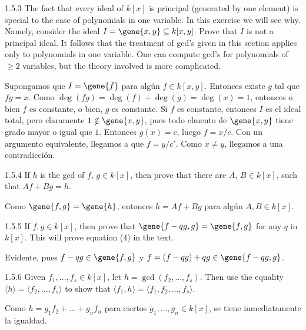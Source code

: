 \documentclass[twoside]{article}
\begin{document}
\begin{ejercicio}{1.5.3}
The fact that every ideal of $k[x]$ is principal (generated by one element) is special to the case of polynomials in one variable.
In this exercise we will see why.
Namely, consider the ideal $I=\gene{x,y} \subseteq k[x,y]$.
Prove that $I$ is not a principal ideal.
It follows that the treatment of gcd’s given in this section applies only to polynomials in one variable.
One can compute gcd’s for polynomials of $≥ 2$ variables, but the theory involved is more complicated.
\end{ejercicio}
\begin{solucion}
Supongamos que $I = \gene{f}$ para algún $f \in k[x,y]$.
Entonces existe $g$ tal que $fg = x$.
Como $\deg(fg) = \deg(f) + \deg(g) = \deg(x) = 1$, entonces o bien $f$ es constante, o bien, $g$ es constante.
Si $f$ es constante, entonces $I$ es el ideal total, pero claramente $1 \notin \gene{x,y}$, pues todo elmento de $\gene{x,y}$ tiene grado mayor o igual que $1$.
Entonces $g(x) = c$, luego $f = x/c$.
Con un argumento equivalente, llegamos a que $f = y/c'$.
Como $x \neq y$, llegamos a una contradicción.
\end{solucion}

\newpage

\begin{ejercicio}{1.5.4}
If $h$ is the gcd of $f$, $g \in k[x]$, then prove that there are $A$, $B \in k[x]$, such that $A f + B g = h$.
\end{ejercicio}
\begin{solucion}
Como $\gene{f,g} = \gene{h}$, entonces $h = A f + B g$ para algún $A, B \in k[x]$.
\end{solucion}

\newpage

\begin{ejercicio}{1.5.5}
If $f,g \in k[x]$, then prove that $\gene{f-qg,g} = \gene{f,g}$ for any $q$ in $k[x]$.
This will prove equation (4) in the text.
\end{ejercicio}
\begin{solucion}
Evidente, pues $f-qg \in \gene{f,g}$ y $f = (f-qg)+qg \in \gene{f-qg,g}$.
\end{solucion}

\newpage

\begin{ejercicio}{1.5.6}
Given $f_1,\dots , f_s ∈ k[x]$, let $h = \gcd( f_2,\dots , f_s)$. Then use the equality 
$\langle h\rangle = 
 \langle f_2,\dots , f_s\rangle$
to show that 
 $\langle f_1, h\rangle = 
 \langle f_1, f_2,\dots, f_s\rangle$.
\end{ejercicio}
\begin{solucion}
Como $h=g_1f_2+\dots+g_nf_n$ para ciertos $g_1,\dots, g_n\in k[x]$, se tiene inmediatamente la igualdad. 
\end{solucion}
\end{document}
